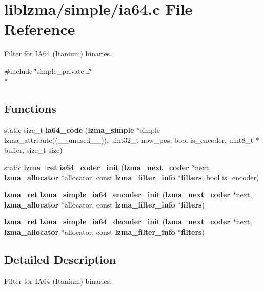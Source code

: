 \section{liblzma/simple/ia64.c File Reference}
\label{ia64_8c}


Filter for I\-A64 (Itanium) binaries.  


{\ttfamily \#include \char`\"{}simple\-\_\-private.\-h\char`\"{}}\\*
\subsection*{Functions}
\begin{DoxyCompactItemize}
\item 
static size\-\_\-t {\bfseries ia64\-\_\-code} ({\bf lzma\-\_\-simple} $\ast$simple lzma\-\_\-attribute((\-\_\-\-\_\-unused\-\_\-\-\_\-)), uint32\-\_\-t now\-\_\-pos, bool is\-\_\-encoder, uint8\-\_\-t $\ast$buffer, size\-\_\-t size)\label{ia64_8c_ae1be54c225a8c1c11fc522ec131bc573}

\item 
static {\bf lzma\-\_\-ret} {\bfseries ia64\-\_\-coder\-\_\-init} ({\bf lzma\-\_\-next\-\_\-coder} $\ast$next, {\bf lzma\-\_\-allocator} $\ast$allocator, const {\bf lzma\-\_\-filter\-\_\-info} $\ast${\bf filters}, bool is\-\_\-encoder)\label{ia64_8c_ac3cd6d84d94428030b2fad2b8ecbd155}

\item 
{\bf lzma\-\_\-ret} {\bfseries lzma\-\_\-simple\-\_\-ia64\-\_\-encoder\-\_\-init} ({\bf lzma\-\_\-next\-\_\-coder} $\ast$next, {\bf lzma\-\_\-allocator} $\ast$allocator, const {\bf lzma\-\_\-filter\-\_\-info} $\ast${\bf filters})\label{ia64_8c_a55b736e2c5b460c3383ff503594be15c}

\item 
{\bf lzma\-\_\-ret} {\bfseries lzma\-\_\-simple\-\_\-ia64\-\_\-decoder\-\_\-init} ({\bf lzma\-\_\-next\-\_\-coder} $\ast$next, {\bf lzma\-\_\-allocator} $\ast$allocator, const {\bf lzma\-\_\-filter\-\_\-info} $\ast${\bf filters})\label{ia64_8c_ab4bed89e53a232474aa07f00401484da}

\end{DoxyCompactItemize}


\subsection{Detailed Description}
Filter for I\-A64 (Itanium) binaries. 